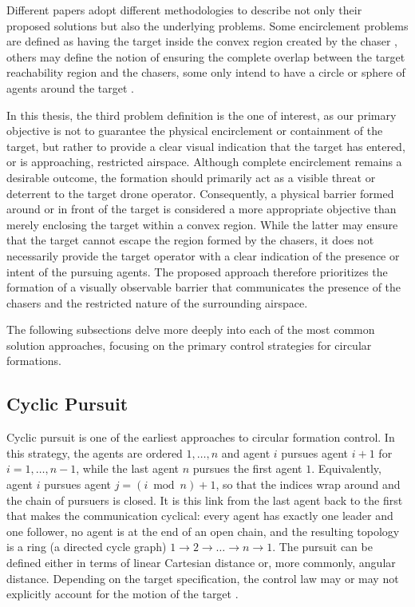 Different papers adopt different methodologies to describe not only their proposed solutions but also the underlying problems. Some encirclement problems are defined as having the target inside the convex region created by the chaser \cite{mycielskiTheoriesPursuitEvasion1988,Wang_2021,Patra2025}, others may define the notion of ensuring the complete overlap between the target reachability region and the chasers, some only intend to have a circle or sphere of agents around the target \cite{wangAchievingSafeMinimum2024,huang2025}.

In this thesis, the third problem definition is the one of interest, as our primary objective is not to guarantee the physical encirclement or containment of the target, but rather to provide a clear visual indication that the target has entered, or is approaching, restricted airspace. Although complete encirclement remains a desirable outcome, the formation should primarily act as a visible threat or deterrent to the target drone operator. Consequently, a physical barrier formed around or in front of the target is considered a more appropriate objective than merely enclosing the target within a convex region. While the latter may ensure that the target cannot escape the region formed by the chasers, it does not necessarily provide the target operator with a clear indication of the presence or intent of the pursuing agents. The proposed approach therefore prioritizes the formation of a visually observable barrier that communicates the presence of the chasers and the restricted nature of the surrounding airspace.

The following subsections delve more deeply into each of the most common solution approaches, focusing on the primary control strategies for circular formations.

\subsection{Cyclic Pursuit} \label{subsec.2:Cyclic Pursuit}

Cyclic pursuit is one of the earliest \cite{Lin2004} approaches to circular formation control. In this strategy, the agents are ordered $1,\dots,n$ and agent $i$ pursues agent $i+1$ for $i = 1,\dots,n-1$, while the last agent $n$ pursues the first agent $1$. Equivalently, agent $i$ pursues agent $j = (i \bmod n) + 1$, so that the indices wrap around and the chain of pursuers is closed. It is this link from the last agent back to the first that makes the communication cyclical: every agent has exactly one leader and one follower, no agent is at the end of an open chain, and the resulting topology is a ring (a directed cycle graph) $1 \to 2 \to \dots \to n \to 1$. The pursuit can be defined either in terms of linear Cartesian distance or, more commonly, angular distance. Depending on the target specification, the control law may or may not explicitly account for the motion of the target \cite{Kim2007}.

